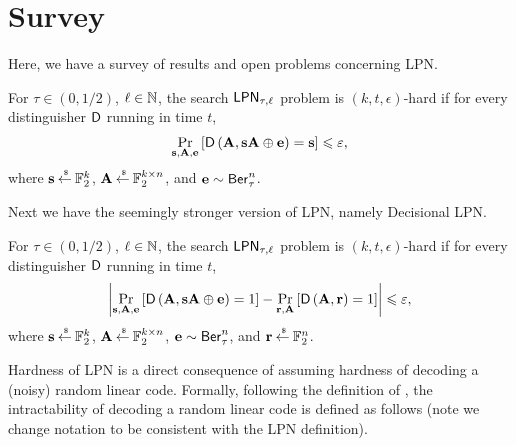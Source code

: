 \section{Survey}
Here, we have a survey of results and open problems concerning LPN.

\begin{definition}\label{def:slpn}
	For $\tau \in (0,1/2)$, $\ell \in {\mathbb N}$, the search $\mathsf{LPN}_{\tau, \ell}$ problem is $(k, t, \epsilon)$-hard if for every distinguisher $\mathsf{D}$ running in time $t$,
	\begin{align*}
		\underset{\mathbf{s}, \mathbf{A}, \mathbf{e}}{\mathop{\mathrm{Pr}}}\left[\mathsf{D}\left(\mathbf{A}, {\mathbf s}{\mathbf A}\oplus\mathbf{e}\right)=\mathbf{s}\right] \leqslant \varepsilon,
	\end{align*}
	where $\mathbf{s} \mathbin{\stackrel{\mbox{\,\tiny \$}}{\gets}} {\mathbb F}^k_2$, $\mathbf{A} \mathbin{\stackrel{\mbox{\,\tiny \$}}{\gets}} {\mathbb F}^{k\times n}_2$, and $\mathbf{e} \sim \mathsf{Ber}^n_\tau$.
\end{definition}
Next we have the seemingly stronger version of LPN, namely Decisional LPN.
\begin{definition}\label{def:dlpn}
	For $\tau \in (0,1/2)$, $\ell \in {\mathbb N}$, the search $\mathsf{LPN}_{\tau, \ell}$ problem is $(k, t, \epsilon)$-hard if for every distinguisher $\mathsf{D}$ running in time $t$,
	\begin{align*}
	\abs{\underset{\vec{s}, \vec{A}, \vec{e}}{\pr}\left[\pred{D}\left(\vec{A}, \vec{sA}\xor\vec{e}\right) = 1\right] -
	\underset{\vec{r}, \vec{A}}{\pr}\left[\pred{D}\left(\vec{A}, \vec{r} \right)=1\right] } \leq \epsilon,
	\end{align*}
	where $\mathbf{s} \mathbin{\stackrel{\mbox{\,\tiny \$}}{\gets}} {\mathbb F}^k_2$, $\mathbf{A} \mathbin{\stackrel{\mbox{\,\tiny \$}}{\gets}} {\mathbb F}^{k\times n}_2$, $\mathbf{e} \sim \mathsf{Ber}^n_\tau$, and $\mathbf{r}\mathbin{\stackrel{\mbox{\,\tiny \$}}{\gets}}{\mathbb F}^n_2$.
\end{definition}

Hardness of LPN is a direct consequence of assuming hardness of decoding a (noisy) random linear code.
Formally, following the definition of \cite{applebaum2008fast}, the intractability of decoding a random linear code is defined as follows (note we change notation to be consistent with the LPN definition).

